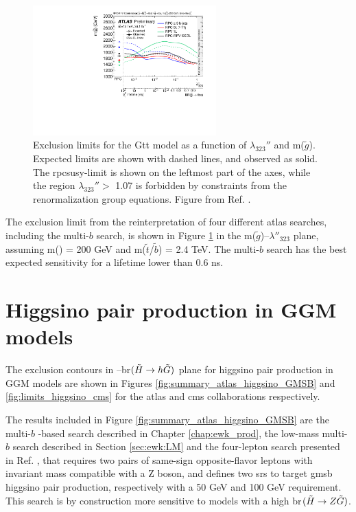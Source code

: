 \begin{figure}[htbp]
	\centering
	\includegraphics[width=0.63\textwidth]{figures/rpv/fig_04.pdf}
	\caption{	
	Exclusion limits for the Gtt model as a function of $\lambda_{323}''$ and m($\tilde{g}$). Expected limits are shown with dashed lines, and observed as solid. The \gls{rpcsusy}-limit is shown on the leftmost part of the axes, while the region $\lambda_{323}''>$ 1.07 is forbidden by constraints from the renormalization group equations. Figure from Ref. \cite{ATLAS-CONF-2018-003}.
	} 
	\label{fig:rpv_Gtt}
\end{figure}

The exclusion limit from the reinterpretation of four different \gls{atlas} searches, including the multi-$b$ search, 
is shown in Figure \ref{fig:rpv_Gtt} in the m($\tilde{g}$)--$\lambda''_{323}$ plane, assuming m(\ninoone) = 200 GeV and  
m($\tilde{t}$/$\tilde{b}$) = 2.4 TeV. 
The multi-$b$ search has the best expected sensitivity 
for a \ninoone lifetime lower than 0.6 ns. 


\FloatBarrier

\section{Higgsino pair production in GGM models}

The exclusion contours in \mhino--\gls{br}$(\tilde{H}\rightarrow h \tilde{G})$ plane for higgsino pair production in GGM models 
are shown in Figures \ref{fig:summary_atlas_higgsino_GMSB} 
and \ref{fig:limits_higgsino_cms} for the \gls{atlas} and \gls{cms} collaborations respectively.

The results included in Figure \ref{fig:summary_atlas_higgsino_GMSB} are the multi-$b$ \met-based search described in Chapter \ref{chap:ewk_prod},
the low-mass multi-$b$ search described in Section \ref{sec:ewk:LM} and 
the four-lepton search presented in Ref. \cite{Aaboud:2018zeb}, that requires two pairs of same-sign opposite-flavor leptons 
with invariant mass compatible with a Z boson, and defines two \glspl{sr} to target \gls{gmsb} higgsino pair production, respectively 
with a 50 GeV and 100 GeV \met requirement. This search is by construction more sensitive to models with a high \gls{br}$(\tilde{H}\rightarrow Z \tilde{G})$.

